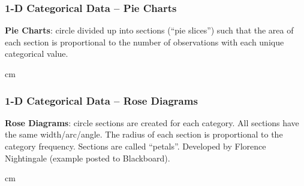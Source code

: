 \documentclass{beamer} %
\begin{document}
\begin{frame}\frametitle{1-D Categorical Data -- Pie Charts}
	\small
	
	\textbf{Pie Charts}:  circle divided up into sections (``pie slices'') such that the area of each section is proportional to the number of observations with each unique categorical value.
	
	
	 cm
	
\end{frame}


\begin{frame}\frametitle{1-D Categorical Data -- Rose Diagrams}
	\small
	
	\textbf{Rose Diagrams}:  circle sections are created for each category.  All sections have the same width/arc/angle.  The radius of each section is proportional to the category frequency.  Sections are called ``petals''.  Developed by Florence Nightingale (example posted to Blackboard).
	
	
	 cm
	
\end{frame}
\end{document}
